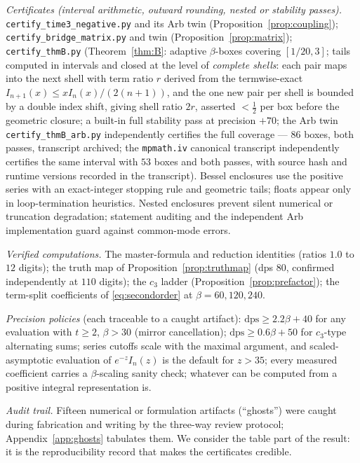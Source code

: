 \documentclass[11pt]{article}
\theoremstyle{remark}
\begin{document}
\begin{sloppypar}
\emph{Certificates (interval arithmetic, outward rounding, nested or
stability passes).} \texttt{certify\_time3\_negative.py} and its Arb twin
(Proposition~\ref{prop:coupling}); \texttt{certify\_bridge\_matrix.py}
and twin (Proposition~\ref{prop:matrix}); \texttt{certify\_thmB.py}
(Theorem~\ref{thm:B}: adaptive $\beta$-boxes covering $[1/20,3]$;
tails computed in intervals and closed at the level of
\emph{complete shells}: each pair maps into the next shell with term
ratio $r$ derived from the termwise-exact
$I_{n+1}(x)\le xI_n(x)/(2(n+1))$, and the one new pair per shell is
bounded by a double index shift, giving shell ratio $2r$, asserted
$<\tfrac12$ per box before the geometric closure; a built-in full stability pass at
precision $+70$; the Arb twin \texttt{certify\_thmB\_arb.py} independently
certifies the full coverage --- $86$ boxes, both passes, transcript
archived; the \texttt{mpmath.iv} canonical transcript independently
certifies the same interval with $53$ boxes and both passes, with source hash
and runtime versions recorded in the transcript). Bessel enclosures use the positive
series with an exact-integer stopping rule and geometric tails; floats
appear only in loop-termination heuristics. Nested enclosures prevent
silent numerical or truncation degradation; statement auditing and the
independent Arb implementation guard against common-mode errors.
\end{sloppypar}

\emph{Verified computations.} The master-formula and reduction identities
(ratios $1.0$ to $12$ digits); the truth map of
Proposition~\ref{prop:truthmap} (dps $80$, confirmed independently at
$110$ digits); the $c_3$ ladder (Proposition~\ref{prop:prefactor}); the
term-split coefficients of \eqref{eq:secondorder} at
$\beta=60,120,240$.

\emph{Precision policies} (each traceable to a caught artifact):
$\mathrm{dps}\ge2.2\beta+40$ for any evaluation with $t\ge2$, $\beta>30$
(mirror cancellation); $\mathrm{dps}\ge0.6\beta+50$ for $c_3$-type
alternating sums; series cutoffs scale with the maximal argument, and
scaled-asymptotic evaluation of $e^{-z}I_n(z)$ is the default for
$z>35$; every measured coefficient carries a $\beta$-scaling sanity
check; whatever can be computed from a positive integral representation
is.

\emph{Audit trail.} Fifteen numerical or formulation artifacts
(``ghosts'') were caught during fabrication and writing by the three-way
review protocol; Appendix~\ref{app:ghosts} tabulates them. We consider
the table part of the result: it is the reproducibility record that
makes the certificates credible.
\end{document}
